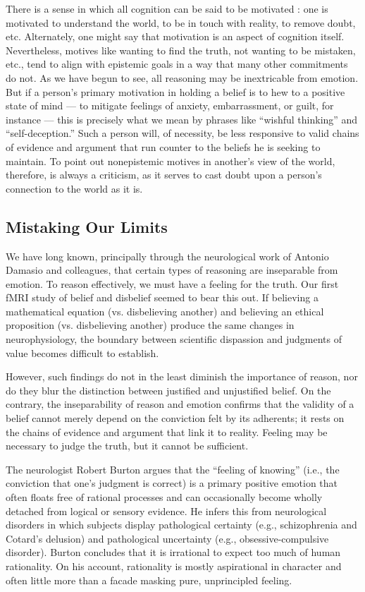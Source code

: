 \documentclass[a4paper,14pt]{extbook}
\begin{document}
There is a sense in which all cognition can be said to be motivated :
one is motivated to understand the world, to be in touch with reality, to remove doubt, etc.
Alternately, one might say that motivation is an aspect of cognition itself.
Nevertheless, motives like wanting to find the truth, not wanting to be mistaken, etc., tend to align with epistemic goals in a way that many other commitments do not.
As we have begun to see, all reasoning may be inextricable from emotion.
But if a person’s primary motivation in holding a belief is to hew to a positive state of mind --- to mitigate feelings of anxiety, embarrassment, or guilt, for instance --- this is precisely what we mean by phrases like ``wishful thinking'' and ``self-deception.''
Such a person will, of necessity, be less responsive to valid chains of evidence and argument that run counter to the beliefs he is seeking to maintain.
To point out nonepistemic motives in another’s view of the world, therefore, is always a criticism, as it serves to cast doubt upon a person’s connection to the world as it is.

\subsection{Mistaking Our Limits}

We have long known, principally through the neurological work of Antonio Damasio and colleagues, that certain types of reasoning are inseparable from emotion.
To reason effectively, we must have a feeling for the truth.
Our first fMRI study of belief and disbelief seemed to bear this out.
If believing a mathematical equation (vs. disbelieving another) and believing an ethical proposition (vs. disbelieving another) produce the same changes in neurophysiology, the boundary between scientific dispassion and judgments of value becomes difficult to establish.

However, such findings do not in the least diminish the importance of reason, nor do they blur the distinction between justified and unjustified belief.
On the contrary, the inseparability of reason and emotion confirms that the validity of a belief cannot merely depend on the conviction felt by its adherents;
it rests on the chains of evidence and argument that link it to reality.
Feeling may be necessary to judge the truth, but it cannot be sufficient.

The neurologist Robert Burton argues that the ``feeling of knowing'' (i.e., the conviction that one’s judgment is correct) is a primary positive emotion that often floats free of rational processes and can occasionally become wholly detached from logical or sensory evidence.
He infers this from neurological disorders in which subjects display pathological certainty (e.g., schizophrenia and Cotard’s delusion) and pathological uncertainty (e.g., obsessive-compulsive disorder).
Burton concludes that it is irrational to expect too much of human rationality.
On his account, rationality is mostly aspirational in character and often little more than a facade masking pure, unprincipled feeling.
\end{document}
